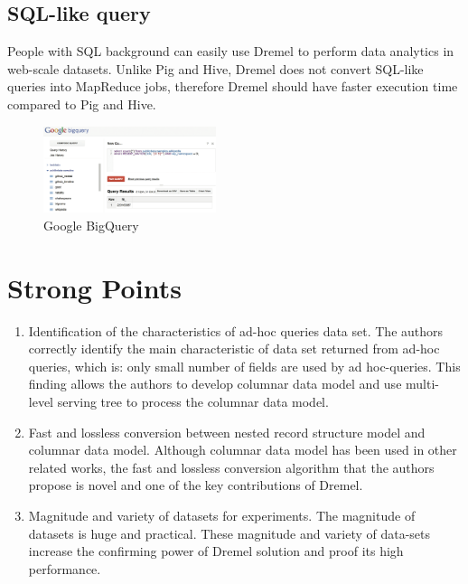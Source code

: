 \documentclass[twocolumn]{article}
\newcommand{\be}{\begin{enumerate}}
\newcommand{\ee}{\end{enumerate}}
\newcommand{\ii}{\item}
\begin{document}
\subsection{SQL-like query}
People with SQL background can easily use Dremel to perform data analytics in web-scale datasets. Unlike Pig and Hive, Dremel does not convert SQL-like queries into MapReduce jobs, therefore Dremel should have faster execution time compared to Pig and Hive.

\begin{figure}[htb]
        \centering
        \includegraphics[width=0.45\textwidth]{google-bigquery.png}
        \caption{Google BigQuery}
        \label{fig:bigquery}
\end{figure}

\section{Strong Points}
\be
\ii Identification of the characteristics of ad-hoc queries data set.
The authors correctly identify the main characteristic of data set returned from ad-hoc queries, which is: only small number of fields are used by ad hoc-queries. This finding allows the authors to develop columnar data model and use multi-level serving tree to process the columnar data model.
\ii Fast and lossless conversion between nested record structure model and columnar data model.
Although columnar data model has been used in other related works, the fast and lossless conversion algorithm that the authors propose is novel and one of the key contributions of Dremel.
\ii Magnitude and variety of datasets for experiments.
The magnitude of datasets is huge and practical. These magnitude and variety of data-sets increase the confirming power of Dremel solution and proof its high performance.
\ee
\end{document}
